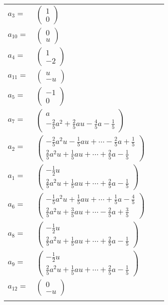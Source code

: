 \documentclass[1p]{elsarticle_modified}
\theoremstyle{definition}
\begin{document}
\begin{tabular}{m{7pt} m{180pt} m{7pt} m{180pt} }
\flushright $a_{3}=$&$\begin{pmatrix}1\\0\end{pmatrix}$ \\
\flushright $a_{10}=$&$\begin{pmatrix}0\\u\end{pmatrix}$ \\
\flushright $a_{4}=$&$\begin{pmatrix}1\\-2\end{pmatrix}$ \\
\flushright $a_{11}=$&$\begin{pmatrix}u\\- u\end{pmatrix}$ \\
\flushright $a_{5}=$&$\begin{pmatrix}-1\\0\end{pmatrix}$ \\
\flushright $a_{7}=$&$\begin{pmatrix}a\\-\frac{2}{5} a^2+\frac{2}{5} a u-\frac{4}{5} a-\frac{1}{5}\end{pmatrix}$ \\
\flushright $a_{2}=$&$\begin{pmatrix}-\frac{2}{5} a^2 u-\frac{1}{5} a u+\cdots-\frac{2}{5} a+\frac{1}{5}\\\frac{2}{5} a^2 u+\frac{1}{5} a u+\cdots+\frac{2}{5} a-\frac{1}{5}\end{pmatrix}$ \\
\flushright $a_{1}=$&$\begin{pmatrix}-\frac{1}{2} u\\\frac{2}{5} a^2 u+\frac{1}{5} a u+\cdots+\frac{2}{5} a-\frac{1}{5}\end{pmatrix}$ \\
\flushright $a_{6}=$&$\begin{pmatrix}-\frac{1}{5} a^2 u+\frac{1}{5} a u+\cdots+\frac{1}{5} a-\frac{4}{5}\\\frac{2}{5} a^2 u+\frac{3}{5} a u+\cdots-\frac{2}{5} a+\frac{3}{5}\end{pmatrix}$ \\
\flushright $a_{8}=$&$\begin{pmatrix}-\frac{1}{2} u\\\frac{2}{5} a^2 u+\frac{1}{5} a u+\cdots+\frac{2}{5} a-\frac{1}{5}\end{pmatrix}$ \\
\flushright $a_{9}=$&$\begin{pmatrix}-\frac{1}{2} u\\\frac{2}{5} a^2 u+\frac{1}{5} a u+\cdots+\frac{2}{5} a-\frac{1}{5}\end{pmatrix}$ \\
\flushright $a_{12}=$&$\begin{pmatrix}0\\- u\end{pmatrix}$\\&\end{tabular}
\end{document}
